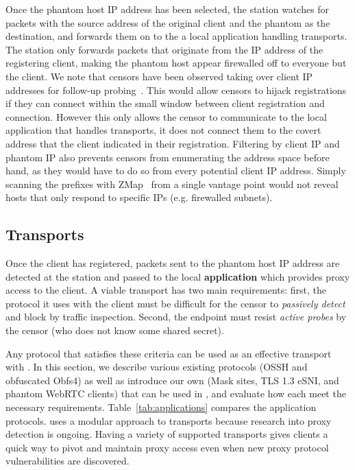 \documentclass[sigconf]{acmart}
\begin{document}
Once the phantom host IP address has been selected, the station watches for
packets with the source address of the original client and the phantom as the destination, 
and forwards them on to the a local application handling transports. The station only 
forwards packets that originate from the IP address of the registering client, making the
 phantom host appear firewalled off to everyone but the client.
We note that censors have been observed taking over client IP
addresses for follow-up probing~\cite{ensafi-tor}. This would allow censors to
hijack registrations if they can connect within the small window between client 
registration and connection. However this only 
allows the censor to communicate to the local application that handles transports, 
it does not connect them to the covert address that the client indicated in their registration. 
Filtering by client IP and phantom IP also prevents censors from enumerating the
address space before hand, as they would have to do so from every potential
client IP address. Simply scanning the prefixes with ZMap~\cite{zmap13} from a
single vantage point would not reveal hosts that only respond to specific IPs
(e.g. firewalled subnets).


\subsection{Transports}


Once the client has registered, packets sent to the phantom host IP address are
detected at the station and passed to the local \textbf{application} which provides
proxy access to the client. A viable \scheme transport has
two main requirements: first, the protocol it uses with the client 
must be difficult for the censor to \emph{passively detect} and block by traffic
inspection. Second, the endpoint must resist \emph{active probes} by the censor (who
does not know some shared secret). 

Any protocol that satisfies these criteria can be used as an effective transport
with \scheme. In this section, we describe various existing protocols (OSSH and obfuscated Obfs4) as well
as introduce our own (Mask sites, TLS 1.3 eSNI, and phantom WebRTC clients) that
can be used in \scheme, and evaluate how each meet the necessary requirements.
Table~\ref{tab:applications} compares the application protocols. \scheme uses a modular 
approach to transports because research into proxy detection is ongoing.
Having a variety of supported transports gives clients a quick way to pivot and 
maintain proxy access even when new proxy protocol vulnerabilities are discovered.
\end{document}
